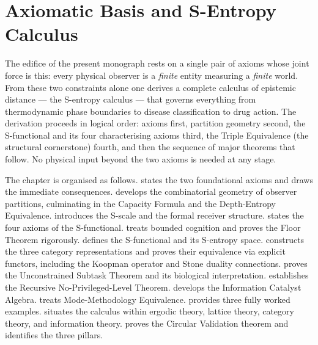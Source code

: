 ﻿%

\chapter{Axiomatic Basis and S-Entropy Calculus}
\label{ch:axioms}
\label{ch:axiomatic-basis}

The edifice of the present monograph rests on a single pair of axioms
whose joint force is this: every physical observer is a \emph{finite}
entity measuring a \emph{finite} world.  From these two constraints alone
one derives a complete calculus of epistemic distance — the S-entropy
calculus — that governs everything from thermodynamic phase boundaries
to disease classification to drug action.  The derivation proceeds in
logical order: axioms first, partition geometry second, the S-functional
and its four characterising axioms third, the Triple Equivalence (the
structural cornerstone) fourth, and then the sequence of major theorems
that follow.  No physical input beyond the two axioms is needed at any
stage.

The chapter is organised as follows.   states the two
foundational axioms and draws the immediate consequences.
 develops the combinatorial geometry of
observer partitions, culminating in the Capacity Formula and the
Depth-Entropy Equivalence.   introduces the S-scale
and the formal receiver structure.   states the four
axioms of the S-functional.   treats bounded
cognition and proves the Floor Theorem rigorously.  
defines the S-functional and its S-entropy space.  
constructs the three category representations and proves their equivalence
via explicit functors, including the Koopman operator and Stone duality
connections.   proves the Unconstrained
Subtask Theorem and its biological interpretation.
 establishes the Recursive
No-Privileged-Level Theorem.   develops the
Information Catalyst Algebra.   treats
Mode-Methodology Equivalence.   provides three
fully worked examples.   situates the
calculus within ergodic theory, lattice theory, category theory, and
information theory.   proves the Circular
Validation theorem and identifies the three pillars.

